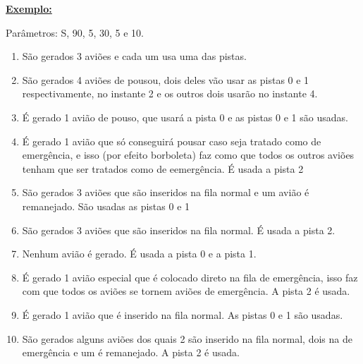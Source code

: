 \documentclass[12pt]{article}
\newcommand{\mytitle}[1]{\textbf{\underline{#1}}}
\begin{document}
\newpage

\mytitle{Exemplo:}

Parâmetros: S, 90, 5, 30, 5 e 10.

\begin{enumerate}[start=0]
\item São gerados 3 aviões e cada um usa uma das pistas.
\item São gerados 4 aviões de pousou, dois deles vão usar as pistas 0 e 1 respectivamente, no instante 2 e os outros dois usarão no instante 4.
\item É gerado 1 avião de pouso, que usará a pista 0 e as pistas 0 e 1 são usadas.
\item É gerado 1 avião que só conseguirá pousar caso seja tratado como de emergência, e isso (por efeito borboleta) faz como que todos os outros aviões tenham que ser tratados como de eemergência. É usada a pista 2
\item São gerados 3 aviões que são inseridos na fila normal e um avião é remanejado. São usadas as pistas 0 e 1
\item São gerados 3 aviões que são inseridos na fila normal. É usada a pista 2.
\item Nenhum avião é gerado. É usada a pista 0 e a pista 1.
\item É gerado 1 avião especial que é colocado direto na fila de emergência, isso faz com que todos os aviões se tornem aviões de emergência. A pista 2 é usada.
\item É gerado 1 avião que é inserido na fila normal. As pistas 0 e 1 são usadas.
\item São gerados alguns aviões dos quais 2 são inserido na fila normal, dois na de emergência e um é remanejado. A pista 2 é usada.   
\end{enumerate}
\end{document}
